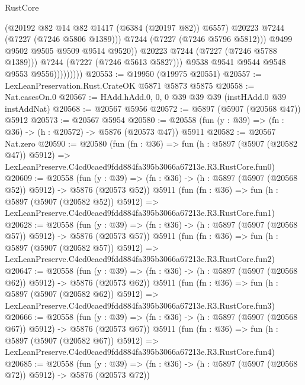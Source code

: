 \begin{lexlean}{RustCore}
\begin{coremodule}
                                  (@20192 @82 @14 @82 @1417 (@6384 (@20197 @82)) @6557)
                                  @20223
                                  @7244
                                  (@7227 (@7246 @5806 @1389)))
                                @7244
                                (@7227 (@7246 @5796 @5812)))
                              @9499
                              @9502
                              @9505
                              @9509
                              @9514
                              @9520))
                          @20223
                          @7244
                          (@7227 (@7246 @5788 @1389)))
                        @7244
                        (@7227 (@7246 @5613 @5827)))
                      @9538
                      @9541
                      @9544
                      @9548
                      @9553
                      @9556)))))))))
@20553 := @19950 (@19975 @20551)
@20557 := LexLeanPreservation.Rust.CrateOK @5871 @5873 @5875
@20558 := Nat.casesOn.{0}
@20567 := HAdd.hAdd.{0, 0, 0} @39 @39 @39 (instHAdd.{0} @39 instAddNat)
@20568 := @20567 @5956
@20572 := @5897 (@5907 (@20568 @47)) @5912
@20573 := @20567 @5954
@20580 := @20558 (fun (y : @39) => (fn : @36) -> (h : @20572) -> @5876 (@20573 @47)) @5911
@20582 := @20567 Nat.zero
@20590 := @20580
    (fun (fn : @36) =>
    fun (h : @5897 (@5907 (@20582 @47)) @5912) =>
    LexLeanPreserve.C4cd0caed9fdd884fa395b3066a67213e.R3.RustCore.fun0)
@20609 := @20558
    (fun (y : @39) => (fn : @36) -> (h : @5897 (@5907 (@20568 @52)) @5912) -> @5876 (@20573 @52))
    @5911
    (fun (fn : @36) =>
    fun (h : @5897 (@5907 (@20582 @52)) @5912) =>
    LexLeanPreserve.C4cd0caed9fdd884fa395b3066a67213e.R3.RustCore.fun1)
@20628 := @20558
    (fun (y : @39) => (fn : @36) -> (h : @5897 (@5907 (@20568 @57)) @5912) -> @5876 (@20573 @57))
    @5911
    (fun (fn : @36) =>
    fun (h : @5897 (@5907 (@20582 @57)) @5912) =>
    LexLeanPreserve.C4cd0caed9fdd884fa395b3066a67213e.R3.RustCore.fun2)
@20647 := @20558
    (fun (y : @39) => (fn : @36) -> (h : @5897 (@5907 (@20568 @62)) @5912) -> @5876 (@20573 @62))
    @5911
    (fun (fn : @36) =>
    fun (h : @5897 (@5907 (@20582 @62)) @5912) =>
    LexLeanPreserve.C4cd0caed9fdd884fa395b3066a67213e.R3.RustCore.fun3)
@20666 := @20558
    (fun (y : @39) => (fn : @36) -> (h : @5897 (@5907 (@20568 @67)) @5912) -> @5876 (@20573 @67))
    @5911
    (fun (fn : @36) =>
    fun (h : @5897 (@5907 (@20582 @67)) @5912) =>
    LexLeanPreserve.C4cd0caed9fdd884fa395b3066a67213e.R3.RustCore.fun4)
@20685 := @20558
    (fun (y : @39) => (fn : @36) -> (h : @5897 (@5907 (@20568 @72)) @5912) -> @5876 (@20573 @72))

\end{coremodule}
\end{lexlean}
